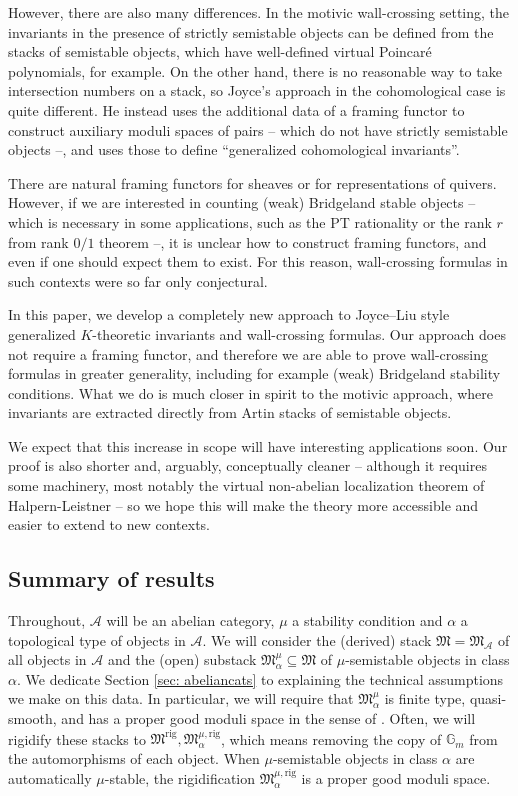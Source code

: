 \documentclass[12pt]{amsart}
\theoremstyle{definition}
\newcommand{\BG}{{\mathbb{G}}}
\newcommand{\CA}{{\mathcal A}}
\newcommand{\1}{\mathbf 1}
\newcommand{\FM}{{\mathfrak{M}}}
\newcommand{\rig}{\mathrm{rig}}
\begin{document}
However, there are also many differences. In the motivic wall-crossing setting, the invariants in the presence of strictly semistable objects can be defined from the stacks of semistable objects, which have well-defined virtual Poincaré polynomials, for example. On the other hand, there is no reasonable way to take intersection numbers on a stack, so Joyce's approach in the cohomological case is quite different. He instead uses the additional data of a framing functor to construct auxiliary moduli spaces of pairs -- which do not have strictly semistable objects --, and uses those to define ``generalized cohomological invariants''.

There are natural framing functors for sheaves or for representations of quivers. However, if we are interested in counting (weak) Bridgeland stable objects -- which is necessary in some applications, such as the PT rationality \cite{todaPTrationality, bridgelandDTPT} or the rank $r$ from rank $0/1$ theorem \cite{FTr0, FTr1} --, it is unclear how to construct framing functors, and even if one should expect them to exist. For this reason, wall-crossing formulas in such contexts were so far only conjectural.

In this paper, we develop a completely new approach to Joyce--Liu style generalized $K$-theoretic invariants and wall-crossing formulas. Our approach does not require a framing functor, and therefore we are able to prove wall-crossing formulas in greater generality, including for example (weak) Bridgeland stability conditions. What we do is much closer in spirit to the motivic approach, where invariants are extracted directly from Artin stacks of semistable objects. 

We expect that this increase in scope will have interesting applications soon. Our proof is also shorter and, arguably, conceptually cleaner -- although it requires some machinery, most notably the virtual non-abelian localization theorem of Halpern-Leistner \cite{HLremarks} -- so we hope this will make the theory more accessible and easier to extend to new contexts.

\subsection{Summary of results} Throughout, $\CA$ will be an abelian category, $\mu$ a stability condition and $\alpha$ a topological type of objects in $\CA$. We will consider the (derived) stack $\FM=\FM_\CA$ of all objects in $\CA$ and the (open) substack $\FM_\alpha^\mu\subseteq \FM$ of $\mu$-semistable objects in class $\alpha$. We dedicate Section \ref{sec: abeliancats} to explaining the technical assumptions we make on this data. In particular, we will require that $\FM_\alpha^\mu$ is finite type, quasi-smooth, and has a proper good moduli space in the sense of \cite{alper}. Often, we will rigidify these stacks to $\FM^\rig, \FM_\alpha^{\mu, \rig}$, which means removing the copy of $\BG_m$ from the automorphisms of each object. When $\mu$-semistable objects in class $\alpha$ are automatically $\mu$-stable, the rigidification $\FM_\alpha^{\mu, \rig}$ is a proper good moduli space.
\end{document}
